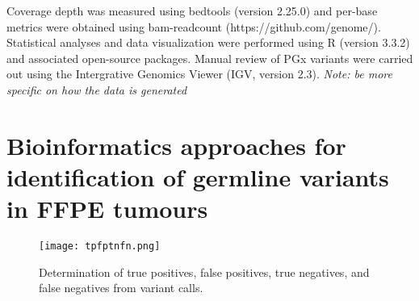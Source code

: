 Coverage depth was measured using bedtools (version 2.25.0) and per-base metrics were obtained using bam-readcount (https://github.com/genome/). Statistical analyses and data visualization were performed using R (version 3.3.2) and associated open-source packages. Manual review of PGx variants were carried out using the Intergrative Genomics Viewer (IGV, version 2.3). \textit{Note: be more specific on how the data is generated}

\section{Bioinformatics approaches for identification of germline variants in FFPE tumours}
\label{sec:BioinformaticsapproachesforidentificationofgermlinevariantsinFFPEtumours}


\begin{figure}[H]
\centering
	\texttt{[image: tpfptnfn.png]}
	\caption{Determination of true positives, false positives, true negatives, and false negatives from variant calls.}
	\label{fig:tpfptnfn}
\end{figure}



\endinput

